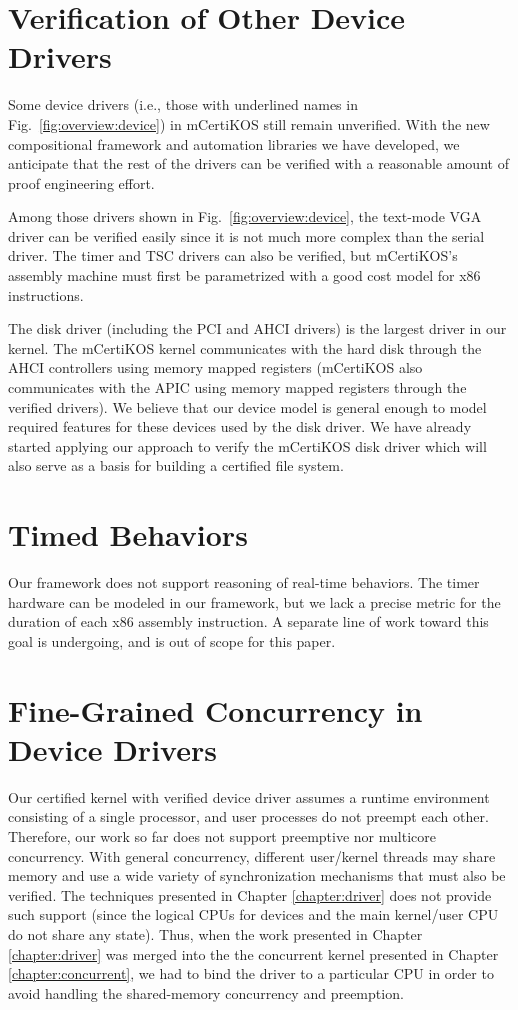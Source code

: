\section{Verification of Other Device Drivers}
Some device drivers (i.e., those with underlined names in
Fig.~\ref{fig:overview:device}) in mCertiKOS still remain unverified.
With the new compositional framework and automation libraries we have
developed, we anticipate that the rest of the drivers can be verified
with a reasonable amount of proof engineering effort.

Among those drivers shown in Fig.~\ref{fig:overview:device}, the
text-mode VGA driver can be verified easily since it is
not much more complex than the serial driver. The timer and TSC drivers
can also be verified, but mCertiKOS's assembly machine must first be
parametrized with a good cost model for x86 instructions.

The disk driver (including the PCI and AHCI drivers) is the largest
driver in our kernel. The mCertiKOS kernel communicates with the hard
disk through the AHCI controllers using memory mapped registers
(mCertiKOS also communicates with the APIC using memory mapped
registers through the verified drivers). We believe that our device
model is general enough to model required features for these devices
used by the disk driver. We have already started applying our approach
to verify the mCertiKOS disk driver which will also serve as a basis
for building a certified file system.

\section{Timed Behaviors}

Our framework does not support reasoning of real-time behaviors.
The timer hardware can be modeled in our framework, but we lack a precise
metric for the duration of each x86 assembly instruction.
A separate line of work toward this goal is undergoing, and is out of scope
for this paper.

\section{Fine-Grained Concurrency in Device Drivers}
Our certified kernel with verified device driver assumes a runtime environment consisting
of a single processor, and user processes do not preempt each other.
Therefore, our work so far does not support preemptive nor multicore
concurrency.  With general concurrency, different user/kernel threads
may share memory and use a wide variety of synchronization
mechanisms that must also be verified.  The techniques presented in
Chapter \ref{chapter:driver} does not provide such support (since the logical CPUs for
devices and the main kernel/user CPU do not share any state). 
Thus, when the work presented in Chapter \ref{chapter:driver} was merged
into the the concurrent kernel presented in Chapter \ref{chapter:concurrent},
we had to bind the driver to a particular CPU in order to avoid handling
the shared-memory concurrency and preemption.

